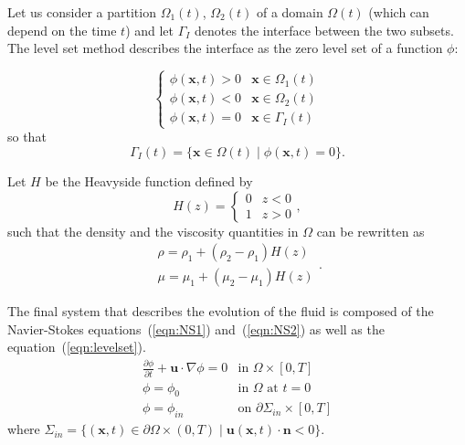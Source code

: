\documentclass[11pt]{article}
\begin{document}
Let us consider a partition $\Omega_1(t)$, $\Omega_2(t)$ of a domain $\Omega(t)$ (which can depend on the time $t$) and let $\Gamma_I$ denotes the interface between the two subsets. The level set method describes the interface as the zero level set of a function $\phi$:

\begin{equation}
\label{levelsetfct}
\left\{ \begin{array}{ll}
\phi(\mathbf{x},t) > 0 & \mathbf{x}\in\Omega_1(t)\\
\phi(\mathbf{x},t) < 0 & \mathbf{x}\in\Omega_2(t)\\
\phi(\mathbf{x},t) = 0 & \mathbf{x}\in\Gamma_I(t)
\end{array}\right.
\end{equation}
so that
\begin{equation}
\Gamma_I(t) = \{\mathbf{x}\in\Omega(t)\mid\phi(\mathbf{x},t)=0\}.
\end{equation}

Let $H$ be the Heavyside function defined by
\begin{equation}
\label{heavysidefct}
H(z)=
\left\{ \begin{array}{ll}
0 & z<0\\
1 & z>0
\end{array}\right. ,
\end{equation}
such that the density and the viscosity quantities in $\Omega$ can be rewritten as
\begin{equation}
\label{heavysidefct}
\begin{array}{ll}
\rho = \rho_1+(\rho_2-\rho_1)H(z)\\
\mu = \mu_1+(\mu_2-\mu_1)H(z)
\end{array}.
\end{equation}

The final system that describes the evolution of the fluid is composed of the Navier-Stokes equations~(\ref{eqn:NS1}) and~(\ref{eqn:NS2}) as well as the equation~(\ref{eqn:levelset}).
\begin{equation}
\label{eqn:levelset}
\begin{array}{ll}
\frac{\partial\phi}{\partial t}+\mathbf{u}\cdot\nabla\phi = 0 & \text{in }\Omega\times[0,T]\\
\phi=\phi_0 & \text{in }\Omega\text{ at }t=0\\
\phi=\phi_{in} & \text{on }\partial\Sigma_{in}\times[0,T]
\end{array}
\end{equation}
where $\Sigma_{in} = \{(\mathbf{x},t)\in\partial\Omega\times(0,T)\mid\mathbf{u}(\mathbf{x},t)\cdot\mathbf{n}<0\}$.
\end{document}
